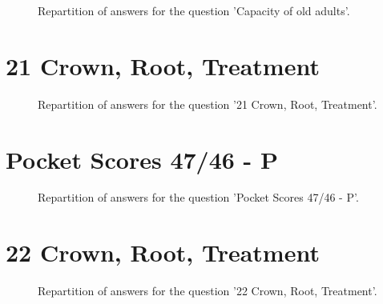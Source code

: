 \documentclass[12pt]{article}
\begin{document}
\begin{figure}[h!]
    \caption{\label{figure:q22-1}Repartition of answers for the question 'Capacity of old adults'.}
\end{figure}



\clearpage{}
\section{21
Crown, Root, Treatment}

\label{sec:33}


\begin{figure}[h!]
    \caption{\label{figure:q33-1}Repartition of answers for the question '21
Crown, Root, Treatment'.}
\end{figure}



\clearpage{}
\section{Pocket Scores
47/46 - P}

\label{sec:66}


\begin{figure}[h!]
    \caption{\label{figure:q66-1}Repartition of answers for the question 'Pocket Scores
47/46 - P'.}
\end{figure}



\clearpage{}
\section{22
Crown, Root, Treatment}

\label{sec:34}


\begin{figure}[h!]
    \caption{\label{figure:q34-1}Repartition of answers for the question '22
Crown, Root, Treatment'.}
\end{figure}
\end{document}
